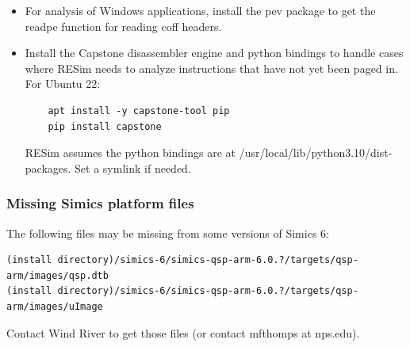 \documentclass[titlepage]{article}
\begin{document}
\begin{itemize}
\item For analysis of Windows applications, install the pev package to get the readpe function for reading coff headers.
\item Install the Capstone disassembler engine and python bindings to handle cases where RESim needs to analyze instructions that have not yet
been paged in.   For Ubuntu 22:
\begin{verbatim}
    apt install -y capstone-tool pip
    pip install capstone
\end{verbatim}
RESim assumes the python bindings are at /usr/local/lib/python3.10/dist-packages.  Set a symlink if needed.

\end{itemize}

\subsubsection{Missing Simics platform files}
The following files may be missing from some versions of Simics 6:
\begin{verbatim}
(install directory)/simics-6/simics-qsp-arm-6.0.?/targets/qsp-arm/images/qsp.dtb
(install directory)/simics-6/simics-qsp-arm-6.0.?/targets/qsp-arm/images/uImage
\end{verbatim}
Contact Wind River to get those files (or contact mfthomps at nps.edu).
\end{document}
